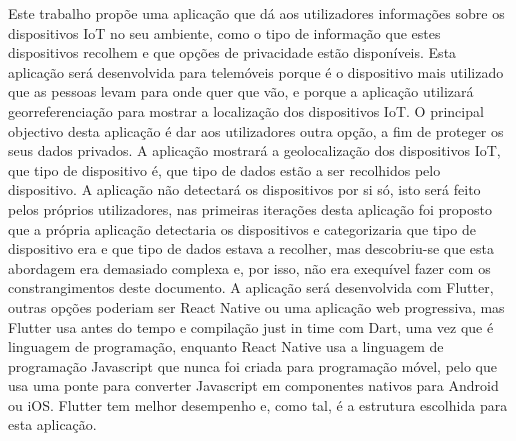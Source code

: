 \documentclass[conference]{IEEEtran}
\begin{document}
Este trabalho propõe uma aplicação que dá aos utilizadores informações sobre
os dispositivos IoT no seu ambiente, como o tipo de informação que estes
dispositivos recolhem e que opções de privacidade estão disponíveis. Esta
aplicação será desenvolvida para telemóveis porque é o dispositivo mais
utilizado que as pessoas levam para onde quer que vão, e porque a aplicação
utilizará georreferenciação para mostrar a localização dos dispositivos IoT.
O principal objectivo desta aplicação é dar aos utilizadores outra opção,
a fim de proteger os seus dados privados. A aplicação mostrará a geolocalização
dos dispositivos IoT, que tipo de dispositivo é, que tipo de dados estão a
ser recolhidos pelo dispositivo. A aplicação não detectará os dispositivos
por si só, isto será feito pelos próprios utilizadores, nas primeiras iterações
desta aplicação foi proposto que a própria aplicação detectaria os dispositivos
e categorizaria que tipo de dispositivo era e que tipo de dados estava a recolher,
mas descobriu-se que esta abordagem era demasiado complexa e, por isso, não
era exequível fazer com os constrangimentos deste documento. A aplicação será
desenvolvida com Flutter, outras opções poderiam ser React Native ou uma aplicação
web progressiva, mas Flutter usa antes do tempo e compilação just in time
com Dart, uma vez que é linguagem de programação, enquanto React Native usa
a linguagem de programação Javascript que nunca foi criada para programação
móvel, pelo que usa uma ponte para converter Javascript em componentes nativos
para Android ou iOS. Flutter tem melhor desempenho e, como tal, é a estrutura
escolhida para esta aplicação.

\end{document}
